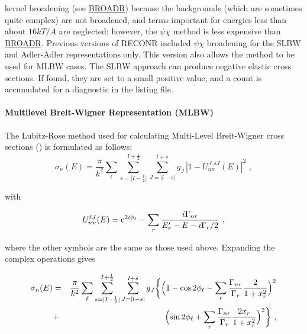 kernel broadening (see
\hyperlink{sBROADRhy}{BROADR})
because the backgrounds (which are sometimes quite complex) are not
broadened, and terms important for energies less than about $16kT/A$
are neglected; however, the $\psi\chi$ method is less expensive than
\hyperlink{sBROADRhy}{BROADR}.  Previous versions of
RECONR included $\psi\chi$ broadening
 for the SLBW
 and Adler-Adler
representations only.  This version also allows the method to be used
for MLBW cases.  The
SLBW approach can produce negative elastic
cross sections. If found, they are
set to a small positive value, and a count is accumulated for a
diagnostic in the listing file.

\paragraph{Multilevel Breit-Wigner Representation (MLBW)}
The Lubitz-Rose method used for calculating Multi-Level
Breit-Wigner cross sections () is formulated as
follows:
\begin{equation}
  \sigma_n(E)={\frac{\pi}{k^2}}
    \sum_\ell \sum_{s=|I-\frac{1}{2}|}^{I+\frac{1}{2}}
    \sum_{J=|l-s|}^{l+s} g_J\,|1-U_{nn}^{\ell sJ}(E)|^2\,\,,
\end{equation}

\noindent with

\begin{equation}
  U_{nn}^{\ell J}(E)={\rm e}^{2i\phi_\ell}-
    \sum_r {\frac{i\Gamma_{nr}}
    {E'_r-E-i\Gamma_r/2}}\,\,,
\end{equation}

\noindent
where the other symbols are the same as those used above.
Expanding the complex operations gives

\begin{eqnarray}
  \sigma_{n}(E)&=&{\frac{\pi}{k^2}}
    \sum_\ell \sum_{s=|I-\frac{1}{2}|}^{I+\frac{1}{2}}
    \sum_{J=|l-s|}^{l+s} g_J
     \biggl\lbrace \Bigl( 1-\cos 2\phi_\ell -
    \sum_r {{\Gamma_{nr}}\over{\Gamma_r}}
    {2\over{1+x_r^2}} \Bigr)^2\nonumber\\
   &+&\Bigl(\sin 2\phi_\ell
    +\sum_r {{\Gamma_{nr}}\over{\Gamma_r}}
    {\frac{2x_r}{1+x_r^2}} \Bigr)^2 \biggr\rbrace \,\,,
\end{eqnarray}

